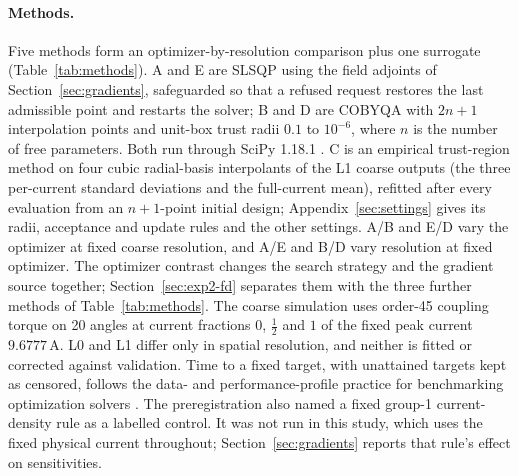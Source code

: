 \paragraph{Methods.}
Five methods form an optimizer-by-resolution comparison plus one
surrogate (Table~\ref{tab:methods}). A and E are SLSQP
\citep{kraft1988} using the field adjoints of Section~\ref{sec:gradients},
safeguarded so that a refused request restores the last admissible point
and restarts the solver; B and D are COBYQA \citep{ragonneau2022} with $2n+1$ interpolation points
and unit-box trust radii $0.1$ to $10^{-6}$, where $n$ is the number of free
parameters. Both run through SciPy 1.18.1 \citep{virtanen2020scipy}. C is
an empirical trust-region method on four cubic radial-basis interpolants
of the L1 coarse outputs (the three per-current standard deviations and
the full-current mean), refitted after every evaluation from an $n+1$-point
initial design; Appendix~\ref{sec:settings} gives its radii, acceptance
and update rules and the other settings. A/B and E/D vary the optimizer at fixed coarse resolution,
and A/E and B/D vary resolution at fixed optimizer. The optimizer contrast
changes the search strategy and the gradient source together;
Section~\ref{sec:exp2-fd} separates them with the three further methods of
Table~\ref{tab:methods}. The coarse simulation uses order-45 coupling torque
on 20 angles at current fractions $0$, $\tfrac12$ and $1$ of the fixed peak
current $9.6777\,\mathrm{A}$. L0 and L1 differ only in spatial resolution,
and neither is fitted or corrected against validation. Time to a fixed
target, with unattained targets kept as censored, follows the data- and performance-profile
practice for benchmarking optimization solvers \citep{more2009benchmarking,dolan2002benchmarking}.
The preregistration also named a fixed group-1 current-density rule as a
labelled control. It was not run in this study, which uses the fixed
physical current throughout; Section~\ref{sec:gradients} reports that
rule's effect on sensitivities.

